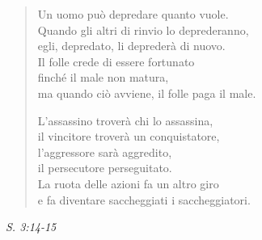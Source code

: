 \begin{quote}
Un uomo può depredare quanto vuole. \\
Quando gli altri di rinvio lo deprederanno, \\
egli, depredato, li deprederà di nuovo. \\
Il folle crede di essere fortunato \\
finché il male non matura, \\
ma quando ciò avviene, il folle paga il male.


L’assassino troverà chi lo assassina, \\
il vincitore troverà un conquistatore, \\
l’aggressore sarà aggredito, \\
il persecutore perseguitato. \\
La ruota delle azioni fa un altro giro \\
e fa diventare saccheggiati i saccheggiatori.
\end{quote}

\emph{S. 3:14-15}


